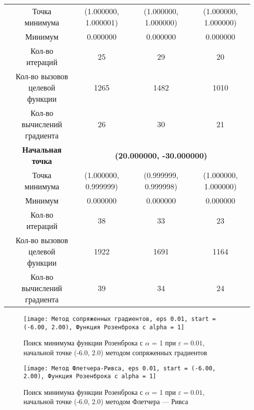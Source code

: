 \begin{table}[H]
\begin{tabular}{|c|c|c|c|c|}
	\cline{2-5}
	&Точка минимума &(1.000000, 1.000001) &(1.000000, 1.000000) &(1.000000, 1.000000) \\ 
	\cline{2-5}
	&Минимум &0.000000 &0.000000 &0.000000 \\ 
	\cline{2-5}
	&Кол-во итераций &25 &29 &20 \\ 
	\cline{2-5}
	&\makecell{Кол-во вызовов\\целевой функции} &1265 &1482 &1010 \\ 
	\cline{2-5}
	&\makecell{Кол-во вычислений\\градиента} &26 &30 &21 \\ 
	\cline{2-5}
\cline{2-5}&\textbf{Начальная точка} &\multicolumn{3}{c|}{\textbf{(20.000000, -30.000000)}}\\
	\cline{2-5}
	&Точка минимума &(1.000000, 0.999999) &(0.999999, 0.999998) &(1.000000, 1.000000) \\ 
	\cline{2-5}
	&Минимум &0.000000 &0.000000 &0.000000 \\ 
	\cline{2-5}
	&Кол-во итераций &38 &33 &23 \\ 
	\cline{2-5}
	&\makecell{Кол-во вызовов\\целевой функции} &1922 &1691 &1164 \\ 
	\cline{2-5}
	&\makecell{Кол-во вычислений\\градиента} &39 &34 &24 \\ 
	\cline{2-5}
	\hline

\end{tabular}
\end{table}


            \begin{figure}[H]
	        \centering
	        \texttt{[image: Метод сопряженных градиентов, eps 0.01, start = (-6.00, 2.00), Функция Розенброка с alpha = 1]}%
	        \caption{Поиск минимума функции Розенброка с $\alpha$ = 1 при $\varepsilon = 0.01$, начальной точке (-6.0, 2.0) методом сопряженных градиентов}
	        \vspace*{-1.2cm}
            \end{figure}
            
            \begin{figure}[H]
	        \centering
	        \texttt{[image: Метод Флетчера-Ривса, eps 0.01, start = (-6.00, 2.00), Функция Розенброка с alpha = 1]}%
	        \caption{Поиск минимума функции Розенброка с $\alpha$ = 1 при $\varepsilon = 0.01$, начальной точке (-6.0, 2.0) методом Флетчера --- Ривса}
	        \vspace*{-1.2cm}
            \end{figure}
            
